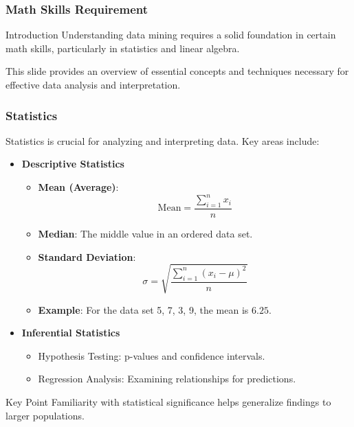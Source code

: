 \documentclass[aspectratio=169]{beamer}
\begin{document}
\begin{frame}[fragile]
    \frametitle{Math Skills Requirement}
    \begin{block}{Introduction}
        Understanding data mining requires a solid foundation in certain math skills, particularly in statistics and linear algebra.
    \end{block}
    This slide provides an overview of essential concepts and techniques necessary for effective data analysis and interpretation.
\end{frame}

\begin{frame}[fragile]
    \frametitle{Statistics}
    Statistics is crucial for analyzing and interpreting data. Key areas include:
    \begin{itemize}
        \item \textbf{Descriptive Statistics}
            \begin{itemize}
                \item \textbf{Mean (Average)}: 
                    \begin{equation}
                        \text{Mean} = \frac{\sum_{i=1}^n x_i}{n}
                    \end{equation}
                \item \textbf{Median}: The middle value in an ordered data set.
                \item \textbf{Standard Deviation}:
                    \begin{equation}
                        \sigma = \sqrt{\frac{\sum_{i=1}^n (x_i - \mu)^2}{n}}
                    \end{equation}
                \item \textbf{Example}: For the data set {5, 7, 3, 9}, the mean is \(6.25\).
            \end{itemize}
        \item \textbf{Inferential Statistics}
            \begin{itemize}
                \item Hypothesis Testing: p-values and confidence intervals.
                \item Regression Analysis: Examining relationships for predictions.
            \end{itemize}
    \end{itemize}
    \begin{block}{Key Point}
        Familiarity with statistical significance helps generalize findings to larger populations.
    \end{block}
\end{frame}
\end{document}
